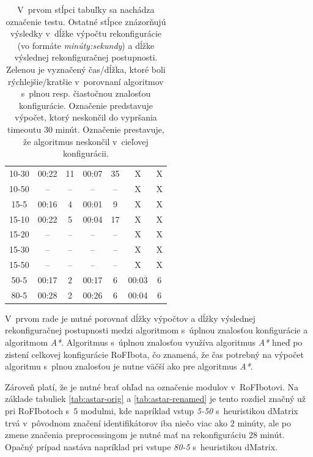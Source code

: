 \documentclass[
  printed, %
  oneside, %
  notable,   %
  nolof,     %
  nolot,     %
]{fithesis3}
\begin{document}
\begin{table}[hp!]
\begin{tabular}{c|cc|cc|cc}
10-30  & \cellcolor{table-green}00:22 & \cellcolor{table-green}11  & 00:07 & 35  & X & X \\
10-50  & -- & --  & -- & --  & X & X \\ \hline
15-5  & \cellcolor{table-green}00:16 & \cellcolor{table-green}4  & 00:01 & 9  & X & X  \\
15-10  & \cellcolor{table-green}00:22 & \cellcolor{table-green}5  & 00:04 & 17  & X & X \\
15-20  & -- & --  & -- & --  & X & X \\
15-30  & -- & --  & -- & --  & X & X \\
15-50  & -- & --  & -- & --  & X & X \\ \hline
50-5  & 00:17 & \cellcolor{table-green}2  & 00:17 & 6  & \cellcolor{table-green}00:03 & 6 \\ \hline
80-5  & 00:28 & \cellcolor{table-green}2  & 00:26 & 6  & \cellcolor{table-green}00:04 & 6 \\
\end{tabular}%
\caption{V~prvom stĺpci tabuľky sa nachádza označenie testu. Ostatné stĺpce znázorňujú výsledky v~dĺžke výpočtu rekonfigurácie (vo formáte \textit{minúty:sekundy}) a dĺžke výslednej rekonfiguračnej postupnosti. \\ \colorbox{table-green}{Zelenou} je vyznačený čas/dĺžka, ktoré boli rýchlejšie/kratšie v~porovnaní algoritmov s~plnou resp. čiastočnou znalosťou konfigurácie. Označenie \mbox{\uv{--}} predstavuje výpočet, ktorý neskončil do vypršania timeoutu 30 minút. Označenie  prestavuje, že algoritmus neskončil v~cieľovej konfigurácii. }
\label{tab:all}
\end{table}

V~prvom rade je nutné porovnať dĺžky výpočtov a dĺžky výslednej rekonfiguračnej postupnosti medzi algoritmom s~úplnou znalosťou konfigurácie a algoritmom \textit{A*}. Algoritmus s~úplnou znalosťou využíva algoritmus \textit{A*} hneď po zistení celkovej konfigurácie RoFIbota, čo znamená, že čas potrebný na výpočet algoritmu s~plnou znalosťou je nutne väčší ako pre algoritmus \textit{A*}. 

Zároveň platí, že je nutné brať ohľad na označenie modulov v~RoFIbotovi. Na základe tabuliek \ref{tab:astar-orig} a \ref{tab:astar-renamed} je tento rozdiel značný už pri RoFIbotoch s~$5$ modulmi, kde napríklad vstup \textit{5-50} s~heuristikou dMatrix trvá v~pôvodnom značení identifikátorov iba niečo viac ako $2$ minúty, ale po zmene značenia preprocessingom je nutné mať na rekonfiguráciu $28$ minút. Opačný prípad nastáva napríklad pri vstupe \textit{80-5} s~heuristikou dMatrix. 
\end{document}
